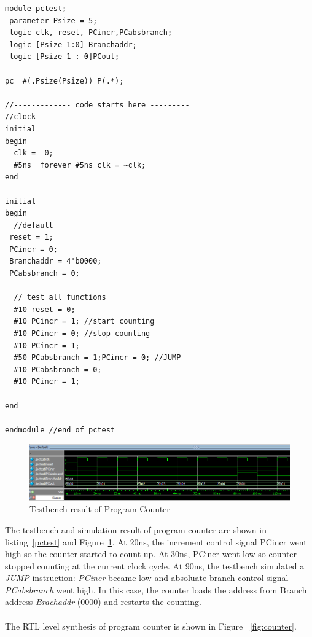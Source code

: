 \begin{lstlisting}
module pctest;
 parameter Psize = 5;
 logic clk, reset, PCincr,PCabsbranch;
 logic [Psize-1:0] Branchaddr;
 logic [Psize-1 : 0]PCout;
 
pc  #(.Psize(Psize)) P(.*);

//------------- code starts here ---------
//clock
initial
begin
  clk =  0;
  #5ns  forever #5ns clk = ~clk;
end

initial
begin
  //default
 reset = 1;
 PCincr = 0;
 Branchaddr = 4'b0000; 
 PCabsbranch = 0;
  
  // test all functions
  #10 reset = 0; 
  #10 PCincr = 1; //start counting
  #10 PCincr = 0; //stop counting
  #10 PCincr = 1;
  #50 PCabsbranch = 1;PCincr = 0; //JUMP
  #10 PCabsbranch = 0;
  #10 PCincr = 1;

end

endmodule //end of pctest
\end{lstlisting}

\begin{figure}[ht!]
		\centering
		\includegraphics[width = \textwidth]{Figures/PC}		
		\caption[Additional Notes]{Testbench result of Program Counter}
		\label {fig:pc}
\end{figure}

The testbench and simulation result of program counter are shown in listing~\ref{pctest} and Figure~\ref{fig:pc}. At 20ns, the increment control signal PCincr went high so the counter started to count up. At 30ns, PCincr went low so counter stopped counting at the current clock cycle. At 90ns, the testbench simulated a \textit{JUMP} instruction: \textit{PCincr} became low and absoluate branch control signal \textit{PCabsbranch} went high. In this case, the counter loads the address from Branch address \textit{Brachaddr} (0000) and restarts the counting.\\\\
The RTL level synthesis of program counter is shown in Figure ~\ref{fig:counter}.

